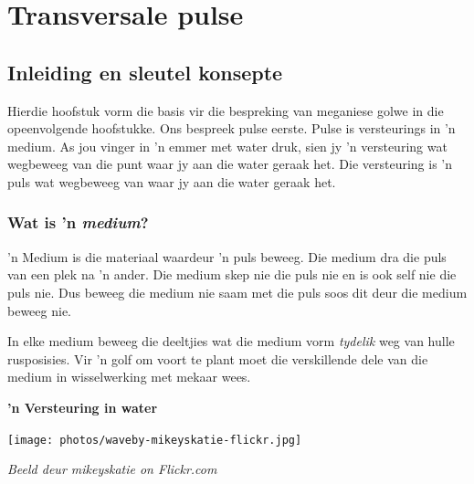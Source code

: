 \chapter{Transversale pulse}
         

\section{Inleiding en sleutel konsepte}
    \nopagebreak
    \label{m38801*cid2}
Hierdie hoofstuk vorm die basis vir die bespreking van meganiese golwe in die opeenvolgende hoofstukke. Ons bespreek pulse eerste. Pulse is versteurings in 'n medium. As jou vinger in 'n emmer met water druk, sien jy 'n versteuring wat wegbeweeg van die punt waar jy aan die water geraak het. Die versteuring is 'n puls wat wegbeweeg van waar jy aan die water geraak het.
            

\subsection*{Wat is 'n \textsl{medium}?}
            \nopagebreak
\begin{minipage}{.5\textwidth}

 'n Medium is die materiaal waardeur 'n puls beweeg. Die medium dra die puls van een plek na 'n ander. Die medium skep nie die puls nie en is ook self nie die puls nie. Dus beweeg die medium nie saam met die puls soos dit deur die medium beweeg nie.

In elke medium beweeg die deeltjies wat die medium vorm \textit{tydelik} weg van hulle rusposisies. Vir 'n golf om voort te plant moet die verskillende dele van die medium in wisselwerking met mekaar wees.
\end{minipage}
\begin{minipage}{.5\textwidth}
\begin{center}
\textbf{ 'n Versteuring in water}\par
 \texttt{[image: photos/waveby-mikeyskatie-flickr.jpg]}\par
\textit{\small Beeld deur mikeyskatie on Flickr.com}
\end{center}
\end{minipage}


\label{m38801*fhsst!!!underscore!!!id51}


